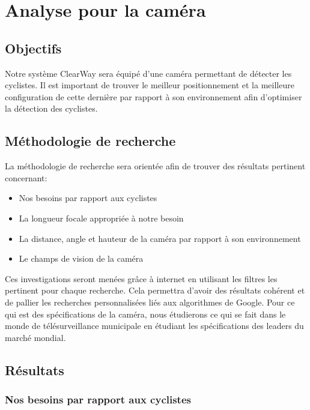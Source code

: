 
\section{Analyse pour la caméra}
\label{sec:camera}

\subsection{Objectifs}
\label{sec:camera_Objectifs}

Notre système ClearWay sera équipé d'une caméra permettant de détecter les cyclistes. 
Il est important de trouver le meilleur positionnement et la meilleure configuration 
de cette dernière par rapport à son environnement afin d'optimiser la détection des cyclistes. 

\subsection{Méthodologie de recherche}
\label{sec:camera_Methodo}

La méthodologie de recherche sera orientée afin de trouver des résultats pertinent concernant:
\begin{itemize}
    \item Nos besoins par rapport aux cyclistes
    \item La longueur focale appropriée à notre besoin
    \item La distance, angle et hauteur de la caméra par rapport à son environnement
    \item Le champs de vision de la caméra
\end{itemize}
Ces investigations seront menées grâce à internet en utilisant les filtres les pertinent pour chaque recherche. 
Cela permettra d'avoir des résultats cohérent et de pallier les recherches personnalisées liés aux algorithmes de Google.
Pour ce qui est des spécifications de la caméra, nous étudierons ce qui se fait dans 
le monde de télésurveillance municipale en étudiant les spécifications des leaders du marché mondial.

\subsection{Résultats}
\label{sec:camera_resultats}

\subsubsection{Nos besoins par rapport aux cyclistes}
\label{sec:camera_cycliste}

